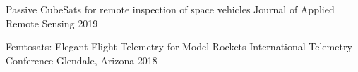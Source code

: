
\begin{cvhonors}

  \cvhonor
  {Passive CubeSats for remote inspection of space vehicles} %
  {Journal of Applied Remote Sensing} %
  {} %
    {2019} %
  
  \cvhonor
  {Femtosats: Elegant Flight Telemetry for Model Rockets} %
  {International Telemetry Conference} %
  {Glendale, Arizona} %
    {2018} %

\end{cvhonors}
